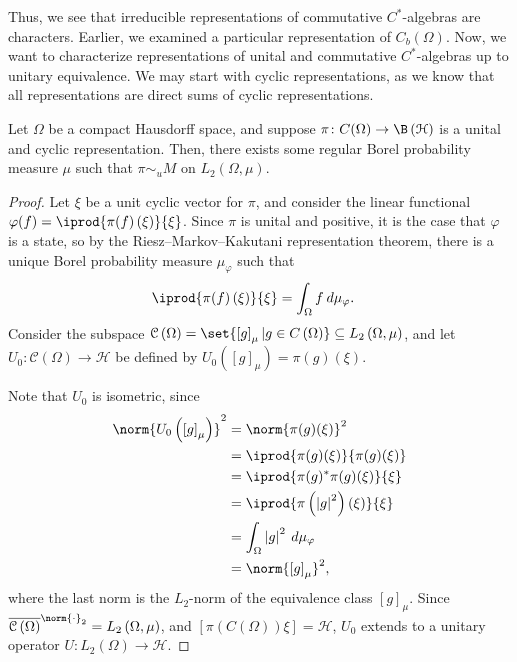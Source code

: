 \documentclass[10pt]{mypackage}
\begin{document}
Thus, we see that irreducible representations of commutative $C^{\ast}$-algebras are characters. Earlier, we examined a particular representation of $C_{b}\left(\Omega\right)$. Now, we want to characterize representations of unital and commutative $C^{\ast}$-algebras up to unitary equivalence. We may start with cyclic representations, as we know that all representations are direct sums of cyclic representations.
\begin{proposition}
  Let $\Omega$ be a compact Hausdorff space, and suppose $\pi\colon C(\Omega)\rightarrow \B\left(\mathcal{H}\right)$ is a unital and cyclic representation. Then, there exists some regular Borel probability measure $\mu$ such that $\pi\sim_{u} M$ on $L_2\left(\Omega,\mu\right)$.
\end{proposition}
\begin{proof}
  Let $\xi$ be a unit cyclic vector for $\pi$, and consider the linear functional $\varphi(f) = \iprod{\pi(f)\left(\xi\right)}{\xi}$. Since $\pi$ is unital and positive, it is the case that $\varphi$ is a state, so by the Riesz--Markov--Kakutani representation theorem, there is a unique Borel probability measure $\mu_{\varphi}$ such that
  \begin{align*}
    \iprod{\pi(f)\left(\xi\right)}{\xi} &= \int_{\Omega}^{} f\:d\mu_{\varphi}.
  \end{align*}
  Consider the subspace $\mathcal{C}\left(\Omega\right) = \set{\left[g\right]_{\mu} | g\in C\left(\Omega\right)}\subseteq L_2\left(\Omega,\mu\right)$, and let $U_0\colon \mathcal{C}\left(\Omega\right)\rightarrow \mathcal{H}$ be defined by $U_0\left(\left[g\right]_{\mu}\right) = \pi(g)\left(\xi\right)$.\newline

  Note that $U_0$ is isometric, since
  \begin{align*}
    \norm{U_0\left(\left[g\right]_{\mu}\right)}^2 &= \norm{\pi(g)(\xi)}^2\\
                                                  &= \iprod{\pi(g)(\xi)}{\pi(g)(\xi)}\\
                                                  &= \iprod{\pi(g)^{\ast}\pi(g)(\xi)}{\xi}\\
                                                  &= \iprod{\pi\left(\left\vert g \right\vert^2\right)\left(\xi\right)}{\xi}\\
                                                  &= \int_{\Omega}^{} \left\vert g \right\vert^2\:d\mu_{\varphi}\\
                                                  &= \norm{\left[g\right]_{\mu}}^2,
  \end{align*}
  where the last norm is the $L_2$-norm of the equivalence class $\left[g\right]_{\mu}$. Since $\overline{\mathcal{C}\left(\Omega\right)}^{\norm{\cdot}_2} = L_2\left(\Omega,\mu\right)$, and $\left[\pi\left(C\left(\Omega\right)\right)\xi\right] = \mathcal{H}$, $U_0$ extends to a unitary operator $U\colon L_2\left(\Omega\right)\rightarrow \mathcal{H}$.\newline


\end{proof}
\end{document}
